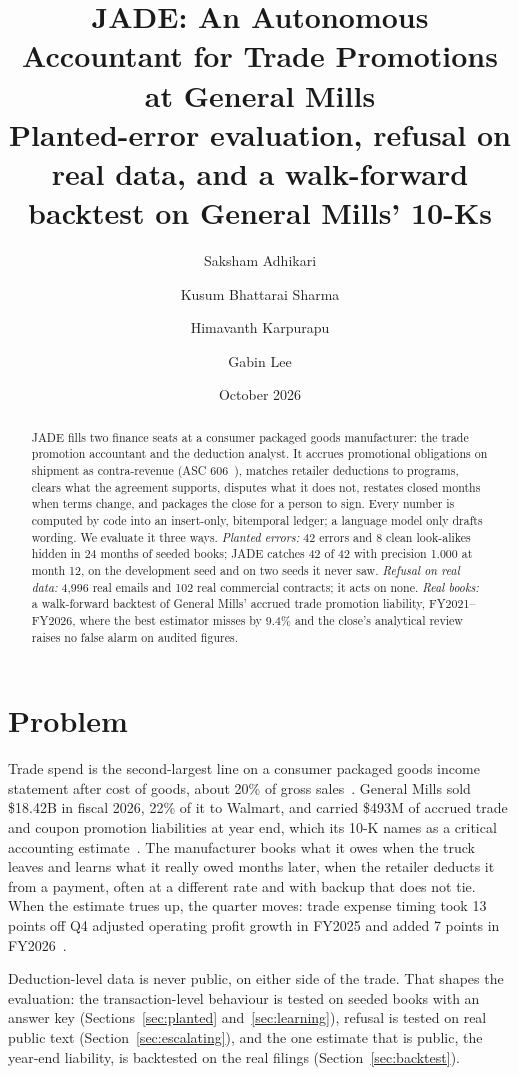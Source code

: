 \documentclass[10pt,letterpaper]{article}
\title{\Large JADE: An Autonomous Accountant for Trade Promotions at General Mills\\
\large Planted-error evaluation, refusal on real data, and a walk-forward backtest on General Mills' 10-Ks}
\author{Saksham Adhikari \and Kusum Bhattarai Sharma \and Himavanth Karpurapu \and Gabin Lee}
\date{October 2026}
\begin{document}
\maketitle

\begin{abstract}
JADE fills two finance seats at a consumer packaged goods manufacturer: the trade promotion accountant
and the deduction analyst. It accrues promotional obligations on shipment as contra-revenue (ASC 606~\cite{asc606-cpc,asc606-vc}),
matches retailer deductions to programs, clears what the agreement supports, disputes what it does not,
restates closed months when terms change, and packages the close for a person to sign. Every number is
computed by code into an insert-only, bitemporal ledger; a language model only drafts wording. We
evaluate it three ways. \emph{Planted errors:} 42 errors and 8 clean look-alikes hidden in 24 months of
seeded books; JADE catches 42 of 42 with precision 1.000 at month 12, on the development seed and on two
seeds it never saw. \emph{Refusal on real data:} 4,996 real emails and 102 real commercial contracts; it
acts on none. \emph{Real books:} a walk-forward backtest of General Mills' accrued trade promotion
liability, FY2021--FY2026, where the best estimator misses by 9.4\% and the close's analytical review
raises no false alarm on audited figures.
\end{abstract}

\section{Problem}
Trade spend is the second-largest line on a consumer packaged goods income statement after cost of goods,
about 20\% of gross sales~\cite{strategyand}.
General Mills sold \$18.42B in fiscal 2026, 22\% of it to Walmart, and carried \$493M of accrued trade and
coupon promotion liabilities at year end, which its 10-K names as a critical accounting estimate~\cite{gis26}. The
manufacturer books what it owes when the truck leaves and learns what it really owed months later, when
the retailer deducts it from a payment, often at a different rate and with backup that does not tie.
When the estimate trues up, the quarter moves: trade expense timing took 13 points off Q4 adjusted
operating profit growth in FY2025 and added 7 points in FY2026~\cite{gis-q4-25,gis-q4-26}.

Deduction-level data is never public, on either side of the trade. That shapes the evaluation: the
transaction-level behaviour is tested on seeded books with an answer key (Sections~\ref{sec:planted}
and~\ref{sec:learning}), refusal is tested on real public text (Section~\ref{sec:escalating}), and the one
estimate that is public, the year-end liability, is backtested on the real filings (Section~\ref{sec:backtest}).
\end{document}

